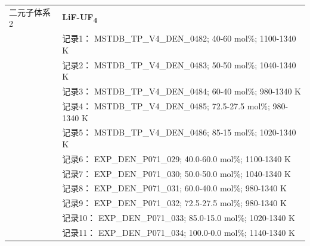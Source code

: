 \documentclass[12pt]{article}
\begin{document}
{\begin{longtable}[]{@{}
  >{\raggedright\arraybackslash}p{}
  >{\raggedright\arraybackslash}p{}@{}}
二元子体系 2  & \textbf{LiF-UF\textsubscript{4}} \\
 & 记录1： MSTDB\_TP\_V4\_DEN\_0482; 40-60 mol\%; 1100-1340 K \\
 & 记录2： MSTDB\_TP\_V4\_DEN\_0483; 50-50 mol\%; 1040-1340 K \\
 & 记录3： MSTDB\_TP\_V4\_DEN\_0484; 60-40 mol\%; 980-1340 K \\
 & 记录4： MSTDB\_TP\_V4\_DEN\_0485; 72.5-27.5 mol\%; 980-1340 K \\
 & 记录5： MSTDB\_TP\_V4\_DEN\_0486; 85-15 mol\%; 1020-1340 K \\
 & 记录6： EXP\_DEN\_P071\_029; 40.0-60.0 mol\%; 1100-1340 K \\
 & 记录7： EXP\_DEN\_P071\_030; 50.0-50.0 mol\%; 1040-1340 K \\
 & 记录8： EXP\_DEN\_P071\_031; 60.0-40.0 mol\%; 980-1340 K \\
 & 记录9： EXP\_DEN\_P071\_032; 72.5-27.5 mol\%; 980-1340 K \\
 & 记录10： EXP\_DEN\_P071\_033; 85.0-15.0 mol\%; 1020-1340 K \\
 & 记录11： EXP\_DEN\_P071\_034; 100.0-0.0 mol\%; 1140-1340 K  \\


\end{longtable}}
\end{document}
